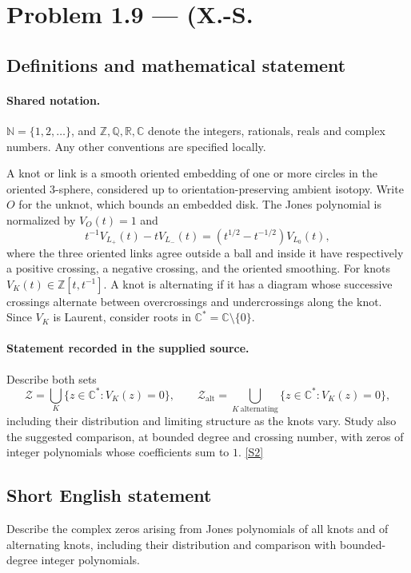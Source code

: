\documentclass[11pt]{article}
\newcommand{\sref}[2]{\hyperlink{source:#1:#2}{[S#2]}}
\begin{document}
\section{Problem 1.9 — (X.-S.}\label{statement}

\subsection{Definitions and mathematical statement}

\paragraph{Shared notation.}$\mathbb N=\{1,2,\ldots\}$, and $\mathbb Z,\mathbb Q,\mathbb R,\mathbb C$ denote the integers, rationals, reals and complex numbers. Any other conventions are specified locally.


A knot or link is a smooth oriented embedding of one or more circles in the oriented $3$-sphere, considered up to orientation-preserving ambient isotopy. Write $O$ for the unknot, which bounds an embedded disk. The Jones polynomial is normalized by $V_O(t)=1$ and
\[t^{-1}V_{L_+}(t)-tV_{L_-}(t)=(t^{1/2}-t^{-1/2})V_{L_0}(t),\]
where the three oriented links agree outside a ball and inside it have respectively a positive crossing, a negative crossing, and the oriented smoothing. For knots $V_K(t)\in\mathbb Z[t,t^{-1}]$. A knot is alternating if it has a diagram whose successive crossings alternate between overcrossings and undercrossings along the knot. Since $V_K$ is Laurent, consider roots in $\mathbb C^*=\mathbb C\setminus\{0\}$.
\paragraph{Statement recorded in the supplied source.}
Describe both sets
\[\mathcal Z=\bigcup_{K}\{z\in\mathbb C^*:V_K(z)=0\},\qquad
\mathcal Z_{\mathrm{alt}}=\bigcup_{K\ \mathrm{alternating}}\{z\in\mathbb C^*:V_K(z)=0\},\]
including their distribution and limiting structure as the knots vary. Study also the suggested comparison, at bounded degree and crossing number, with zeros of integer polynomials whose coefficients sum to $1$. \sref{statement}{2}
\subsection{Short English statement}
Describe the complex zeros arising from Jones polynomials of all knots and of alternating knots, including their distribution and comparison with bounded-degree integer polynomials.
\end{document}
